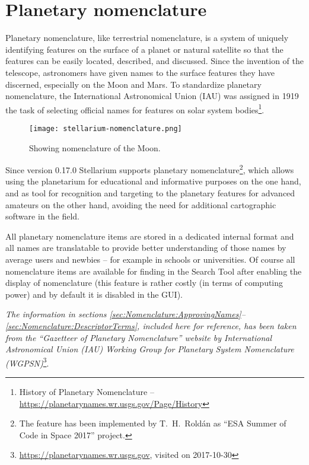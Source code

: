 
\chapter{Planetary nomenclature}
\label{ch:Nomenclature}

 Planetary nomenclature, like terrestrial nomenclature, is a system of uniquely identifying features on the surface of a planet or natural satellite so that the features can be easily located, described, and discussed. Since the invention of the telescope, astronomers have given names to the surface features they have discerned, especially on the Moon and Mars. To standardize planetary nomenclature, the International Astronomical Union (IAU) was assigned in 1919 the task of selecting official names for features on solar system bodies\footnote{History of Planetary Nomenclature -- \url{https://planetarynames.wr.usgs.gov/Page/History}}.

\begin{figure}[ht]
\centering\texttt{[image: stellarium-nomenclature.png]}
\caption{Showing nomenclature of the Moon.}
\label{fig:Nomenclature:Moon}
\end{figure}

Since version 0.17.0 Stellarium supports planetary nomenclature\footnote{The feature has been implemented by T.~H.~Roldán as ``ESA Summer of Code in Space 2017'' project.}, which allows using the planetarium for educational and informative purposes on the one hand, and as tool for recognition and targeting to the planetary features for advanced amateurs on the other hand, avoiding the need for additional cartographic software in the field. 

All planetary nomenclature items are stored in a dedicated internal format and all names are translatable to provide better understanding of those names by average users and newbies -- for example in schools or universities.  Of course all nomenclature items are available for finding in the Search Tool after enabling the display of nomenclature (this feature is rather costly (in terms of computing power) and by default it is disabled in the GUI).

\emph{The information in sections \ref{sec:Nomenclature:ApprovingNames}--\ref{sec:Nomenclature:DescriptorTerms}, included here for reference, has been taken from the ``Gazetteer of Planetary Nomenclature'' website by International Astronomical Union (IAU) Working Group for Planetary System Nomenclature (WGPSN)}\footnote{\url{https://planetarynames.wr.usgs.gov}, visited on 2017-10-30}.

